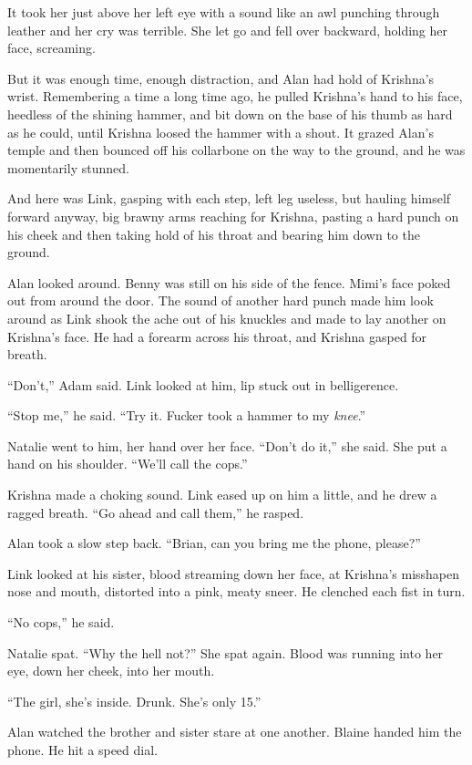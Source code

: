 \documentclass{article}
\begin{document}
It took her just above her left eye with a sound like an awl punching
through leather and her cry was terrible.  She let go and fell over
backward, holding her face, screaming.

But it was enough time, enough distraction, and Alan had hold of
Krishna's wrist.  Remembering a time a long time ago, he pulled
Krishna's hand to his face, heedless of the shining hammer, and bit
down on the base of his thumb as hard as he could, until Krishna
loosed the hammer with a shout.  It grazed Alan's temple and then
bounced off his collarbone on the way to the ground, and he was
momentarily stunned.

And here was Link, gasping with each step, left leg useless, but
hauling himself forward anyway, big brawny arms reaching for Krishna,
pasting a hard punch on his cheek and then taking hold of his throat
and bearing him down to the ground.

Alan looked around.  Benny was still on his side of the fence.  Mimi's
face poked out from around the door.  The sound of another hard punch
made him look around as Link shook the ache out of his knuckles and
made to lay another on Krishna's face.  He had a forearm across his
throat, and Krishna gasped for breath.

``Don't,'' Adam said.  Link looked at him, lip stuck out in
belligerence. 

``Stop me,'' he said.  ``Try it.  Fucker took a hammer to my
\textit{knee}.''

Natalie went to him, her hand over her face.  ``Don't do it,'' she
said.  She put a hand on his shoulder.  ``We'll call the cops.''

Krishna made a choking sound.  Link eased up on him a little, and he
drew a ragged breath.  ``Go ahead and call them,'' he rasped.

Alan took a slow step back.  ``Brian, can you bring me the phone,
please?''

Link looked at his sister, blood streaming down her face, at Krishna's
misshapen nose and mouth, distorted into a pink, meaty sneer.  He
clenched each fist in turn.

``No cops,'' he said. 

Natalie spat.  ``Why the hell not?'' She spat again.  Blood was
running into her eye, down her cheek, into her mouth.

``The girl, she's inside.  Drunk.  She's only 15.''

Alan watched the brother and sister stare at one another.  Blaine
handed him the phone.  He hit a speed dial.
\end{document}
